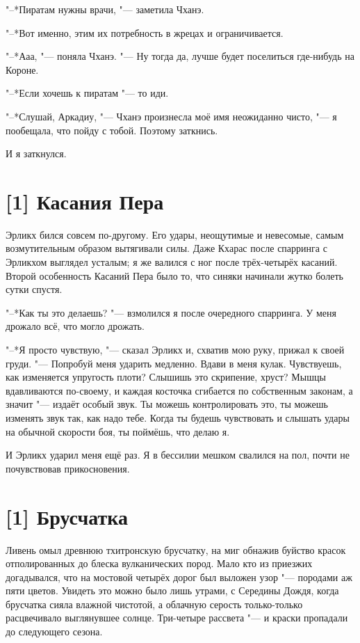 "--*Пиратам нужны врачи, "--- заметила Чханэ.

"--*Вот именно, этим их потребность в жрецах и ограничивается.

"--*Ааа, "--- поняла Чханэ.
"--- Ну тогда да, лучше будет поселиться где-нибудь на Короне.

"--*Если хочешь к пиратам "--- то иди.

"--*Слушай, Аркадиу, "--- Чханэ произнесла моё имя неожиданно чисто, "--- я пообещала, что пойду с тобой.
Поэтому заткнись.

И я заткнулся.

\section{[1] Касания Пера}

Эрликх бился совсем по-другому.
Его удары, неощутимые и невесомые, самым возмутительным образом вытягивали силы.
Даже Кхарас после спарринга с Эрликхом выглядел усталым;
я же валился с ног после трёх-четырёх касаний.
Второй особенность Касаний Пера было то, что синяки начинали жутко болеть сутки спустя.

"--*Как ты это делаешь? "--- взмолился я после очередного спарринга.
У меня дрожало всё, что могло дрожать.

"--*Я просто чувствую, "--- сказал Эрликх и, схватив мою руку, прижал к своей груди.
"--- Попробуй меня ударить медленно.
Вдави в меня кулак.
Чувствуешь, как изменяется упругость плоти?
Слышишь это скрипение, хруст?
Мышцы вдавливаются по-своему, и каждая косточка сгибается по собственным законам, а значит "--- издаёт особый звук.
Ты можешь контролировать это, ты можешь изменять звук так, как надо тебе.
Когда ты будешь чувствовать и слышать удары на обычной скорости боя, ты поймёшь, что делаю я.

И Эрликх ударил меня ещё раз.
Я в бессилии мешком свалился на пол, почти не почувствовав прикосновения.

\section{[1] Брусчатка}

Ливень омыл древнюю тхитронскую брусчатку, на миг обнажив буйство красок отполированных до блеска вулканических пород.
Мало кто из приезжих догадывался, что на мостовой четырёх дорог был выложен узор "--- породами аж пяти цветов.
Увидеть это можно было лишь утрами, с Середины Дождя, когда брусчатка сияла влажной чистотой, а облачную серость только-только расцвечивало выглянувшее солнце.
Три-четыре рассвета "--- и краски пропадали до следующего сезона.

